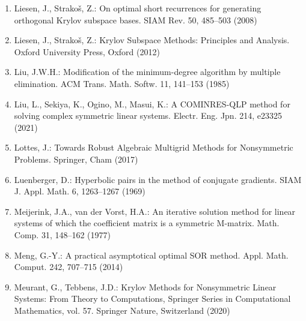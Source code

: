 \begin{enumerate}[label=\arabic*.,ref=\arabic*,leftmargin=3em]
\item\label{bib:source-121}Liesen, J., Strakoš, Z.: On optimal short recurrences for generating orthogonal Krylov subspace bases. SIAM Rev. 50, 485–503 (2008)

\item\label{bib:source-122}Liesen, J., Strakoš, Z.: Krylov Subspace Methods: Principles and Analysis. Oxford University Press, Oxford (2012)

\item\label{bib:source-123}Liu, J.W.H.: Modification of the minimum-degree algorithm by multiple elimination. ACM Trans. Math. Softw. 11, 141–153 (1985)

\item\label{bib:source-124}Liu, L., Sekiya, K., Ogino, M., Masui, K.: A COMINRES-QLP method for solving complex symmetric linear systems. Electr. Eng. Jpn. 214, e23325 (2021)

\item\label{bib:source-125}Lottes, J.: Towards Robust Algebraic Multigrid Methods for Nonsymmetric Problems. Springer, Cham (2017)

\item\label{bib:source-126}Luenberger, D.: Hyperbolic pairs in the method of conjugate gradients. SIAM J. Appl. Math. 6, 1263–1267 (1969)

\item\label{bib:source-127}Meijerink, J.A., van der Vorst, H.A.: An iterative solution method for linear systems of which the coefficient matrix is a symmetric M-matrix. Math. Comp. 31, 148–162 (1977)

\item\label{bib:source-128}Meng, G.-Y.: A practical asymptotical optimal SOR method. Appl. Math. Comput. 242, 707–715 (2014)

\item\label{bib:source-129}Meurant, G., Tebbens, J.D.: Krylov Methods for Nonsymmetric Linear Systems: From Theory to Computations, Springer Series in Computational Mathematics, vol. 57. Springer Nature, Switzerland (2020)


\end{enumerate}
